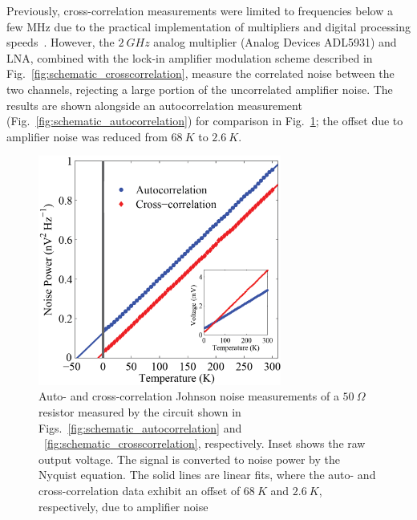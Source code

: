 Previously, cross-correlation measurements were limited to frequencies below a few MHz due to the practical implementation of multipliers and digital processing speeds~\cite{brophy_correlatoramplifier_1965, klein_measurement_1979, sampietro_high_2000, dicarlo_system_2006}. However, the $2~GHz$ analog multiplier (Analog Devices ADL5931) and LNA, combined with the lock-in amplifier modulation scheme described in Fig.~\ref{fig:schematic_crosscorrelation}, measure the correlated noise between the two channels, rejecting a large portion of the uncorrelated amplifier noise. The results are shown alongside an autocorrelation measurement (Fig.~\ref{fig:schematic_autocorrelation}) for comparison in Fig.~\ref{fig:cross_noise_vs_T}; the offset due to amplifier noise was reduced from $68~K$ to $2.6~K$.

\begin{figure}
\centering
\includegraphics[width = 80mm]{figures/Johnson_noise_thermometry/Cross_noise_vs_T.png}
\caption{Auto- and cross-correlation Johnson noise measurements of a $50~\Omega$ resistor measured by the circuit shown in Figs.~\ref{fig:schematic_autocorrelation} and ~\ref{fig:schematic_crosscorrelation}, respectively. Inset shows the raw output voltage. The signal is converted to noise power by the Nyquist equation. The solid lines are linear fits, where the auto- and cross-correlation data exhibit an offset of $68~K$ and $2.6~K$, respectively, due to amplifier noise}
\label{fig:cross_noise_vs_T}
\end{figure}

